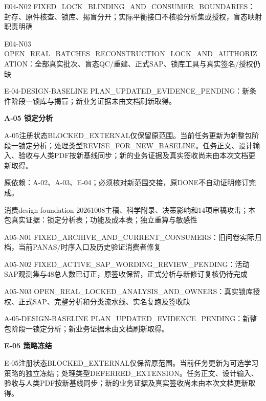 \documentclass[11pt,a4paper]{article}
\newcommand{\reviewsection}[1]{\par\Needspace{5\baselineskip}\vspace{10pt}\begin{center}{\titlelatin\titlecjk\bfseries\fontsize{14}{20}\selectfont #1}\end{center}}
\begin{document}
E04-\allowbreak{}N02 FIXED\_\allowbreak{}LOCK\_\allowbreak{}BLINDING\_\allowbreak{}AND\_\allowbreak{}CONSUMER\_\allowbreak{}BOUNDARIES：封存、原件核查、锁库、揭盲分开；实际平衡接口不核验分析集或授权，盲态映射职责明确


E04-\allowbreak{}N03 OPEN\_\allowbreak{}REAL\_\allowbreak{}BATCHES\_\allowbreak{}RECONSTRUCTION\_\allowbreak{}LOCK\_\allowbreak{}AND\_\allowbreak{}AUTHORIZATION：全部真实批次、盲态QC/\allowbreak{}重建、正式SAP、锁库工具与真实签名/\allowbreak{}授权仍缺


E-\allowbreak{}04-\allowbreak{}DESIGN-\allowbreak{}BASELINE PLAN\_\allowbreak{}UPDATED\_\allowbreak{}EVIDENCE\_\allowbreak{}PENDING：新条件阶段一锁库与揭盲；新业务证据未由文档刷新取得。


\reviewsection{A-\allowbreak{}05 锁定分析}
A-\allowbreak{}05注册状态BLOCKED\_\allowbreak{}EXTERNAL仅保留原范围。当前任务更新为新整包阶段一锁定分析；处理类型REVISE\_\allowbreak{}FOR\_\allowbreak{}NEW\_\allowbreak{}BASELINE。任务正文、设计输入、验收与人类PDF按新基线同步；新的业务证据及真实签收尚未由本次文档更新取得。


原依赖：A-\allowbreak{}02、A-\allowbreak{}03、E-\allowbreak{}04；必须核对新范围交接，原DONE不自动证明修订完成。


消费design-\allowbreak{}foundation-\allowbreak{}20261008主稿、科学附录、决策影响和14项审稿攻击；本包真实证据：锁定分析表；功能及成本表；独立重算与敏感性


A05-\allowbreak{}N01 FIXED\_\allowbreak{}ARCHIVE\_\allowbreak{}AND\_\allowbreak{}CURRENT\_\allowbreak{}CONSUMERS：旧问卷实际归档，当前PANAS/\allowbreak{}时序入口及历史验证消费者修复


A05-\allowbreak{}N02 FIXED\_\allowbreak{}ACTIVE\_\allowbreak{}SAP\_\allowbreak{}WORDING\_\allowbreak{}REVIEW\_\allowbreak{}PENDING：活动SAP观测集与48总人数已订正，原签收保留，正式分析与新修订复核仍待完成


A05-\allowbreak{}N03 OPEN\_\allowbreak{}REAL\_\allowbreak{}LOCKED\_\allowbreak{}ANALYSIS\_\allowbreak{}AND\_\allowbreak{}OWNERS：真实锁库授权、正式SAP、完整分析和分类流水线、实名复跑及签收缺


A-\allowbreak{}05-\allowbreak{}DESIGN-\allowbreak{}BASELINE PLAN\_\allowbreak{}UPDATED\_\allowbreak{}EVIDENCE\_\allowbreak{}PENDING：新整包阶段一锁定分析；新业务证据未由文档刷新取得。


\reviewsection{E-\allowbreak{}05 策略冻结}
E-\allowbreak{}05注册状态BLOCKED\_\allowbreak{}EXTERNAL仅保留原范围。当前任务更新为可选学习策略的独立冻结；处理类型DEFERRED\_\allowbreak{}EXTENSION。任务正文、设计输入、验收与人类PDF按新基线同步；新的业务证据及真实签收尚未由本次文档更新取得。
\end{document}
